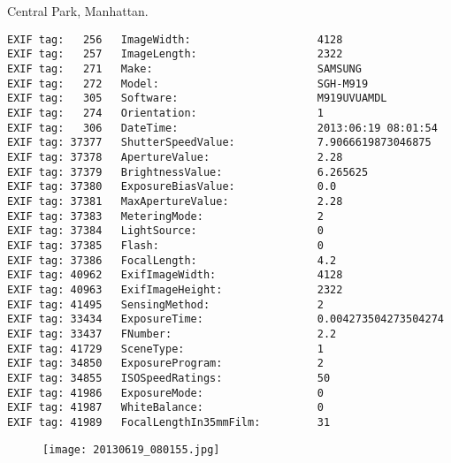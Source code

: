 \section{\protect{}}
\noindent Central Park, Manhattan.
\noindent
\begin{lstlisting}
EXIF tag:   256   ImageWidth:                    4128
EXIF tag:   257   ImageLength:                   2322
EXIF tag:   271   Make:                          SAMSUNG
EXIF tag:   272   Model:                         SGH-M919
EXIF tag:   305   Software:                      M919UVUAMDL
EXIF tag:   274   Orientation:                   1
EXIF tag:   306   DateTime:                      2013:06:19 08:01:54
EXIF tag: 37377   ShutterSpeedValue:             7.9066619873046875
EXIF tag: 37378   ApertureValue:                 2.28
EXIF tag: 37379   BrightnessValue:               6.265625
EXIF tag: 37380   ExposureBiasValue:             0.0
EXIF tag: 37381   MaxApertureValue:              2.28
EXIF tag: 37383   MeteringMode:                  2
EXIF tag: 37384   LightSource:                   0
EXIF tag: 37385   Flash:                         0
EXIF tag: 37386   FocalLength:                   4.2
EXIF tag: 40962   ExifImageWidth:                4128
EXIF tag: 40963   ExifImageHeight:               2322
EXIF tag: 41495   SensingMethod:                 2
EXIF tag: 33434   ExposureTime:                  0.004273504273504274
EXIF tag: 33437   FNumber:                       2.2
EXIF tag: 41729   SceneType:                     1
EXIF tag: 34850   ExposureProgram:               2
EXIF tag: 34855   ISOSpeedRatings:               50
EXIF tag: 41986   ExposureMode:                  0
EXIF tag: 41987   WhiteBalance:                  0
EXIF tag: 41989   FocalLengthIn35mmFilm:         31

\end{lstlisting}
\clearpage
\begin{figure}
\raggedleft
\texttt{[image: 20130619\_080155.jpg]}
\end{figure}


\clearpage
